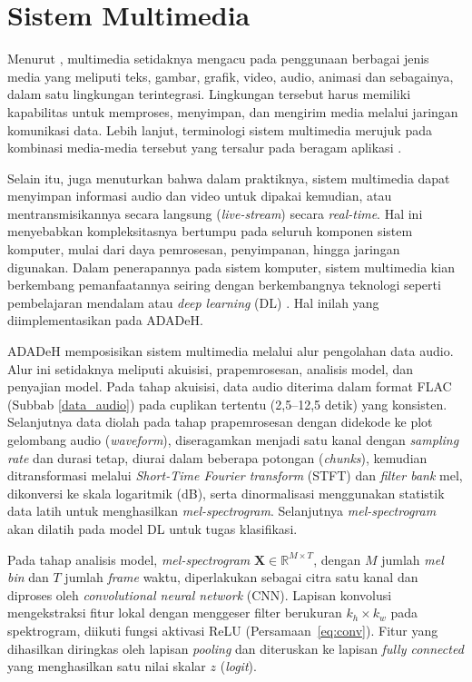 \section{Sistem Multimedia}
\label{sist_mulmed}

Menurut \textcite{bandung2025inovasi}, multimedia setidaknya mengacu pada penggunaan berbagai jenis media yang meliputi teks, gambar, grafik, video, audio, animasi dan sebagainya, dalam satu lingkungan terintegrasi. Lingkungan tersebut harus memiliki kapabilitas untuk memproses, menyimpan, dan mengirim media melalui jaringan komunikasi data. Lebih lanjut, terminologi sistem multimedia merujuk pada kombinasi media-media tersebut yang tersalur pada beragam aplikasi \autocite{furht1994overview}. 

Selain itu, \textcite{furht1994overview} juga menuturkan bahwa dalam praktiknya, sistem multimedia dapat menyimpan informasi audio dan video untuk dipakai kemudian, atau mentransmisikannya secara langsung (\textit{live-stream}) secara \textit{real-time}. Hal ini menyebabkan kompleksitasnya bertumpu pada seluruh komponen sistem komputer, mulai dari daya pemrosesan, penyimpanan, hingga jaringan digunakan. Dalam penerapannya pada sistem komputer, sistem multimedia kian berkembang pemanfaatannya seiring dengan berkembangnya teknologi seperti pembelajaran mendalam atau \textit{deep learning} (DL) \autocite{li2021fundamentals}. Hal inilah yang diimplementasikan pada ADADeH.

ADADeH memposisikan sistem multimedia melalui alur pengolahan data audio. Alur ini setidaknya meliputi akuisisi, prapemrosesan, analisis model, dan penyajian model. Pada tahap akuisisi, data audio diterima dalam format FLAC (Subbab \ref{data_audio}) pada cuplikan tertentu (2,5--12,5 detik) yang konsisten. Selanjutnya data diolah pada tahap prapemrosesan dengan didekode ke plot gelombang audio (\textit{waveform}), diseragamkan menjadi satu kanal dengan \textit{sampling rate} dan durasi tetap, diurai dalam beberapa potongan (\textit{chunks}), kemudian ditransformasi melalui \textit{Short-Time Fourier transform} (STFT) dan \textit{filter bank} mel, dikonversi ke skala logaritmik (dB), serta dinormalisasi menggunakan statistik data latih untuk menghasilkan \textit{mel-spectrogram}. Selanjutnya \textit{mel-spectrogram} akan dilatih pada model DL untuk tugas klasifikasi.

Pada tahap analisis model, \textit{mel-spectrogram} $\mathbf{X} \in \mathbb{R}^{M \times T}$, dengan $M$ jumlah \textit{mel bin} dan $T$ jumlah \textit{frame} waktu, diperlakukan sebagai citra satu kanal dan diproses oleh \textit{convolutional neural network} (CNN). Lapisan konvolusi mengekstraksi fitur lokal dengan menggeser filter berukuran $k_h \times k_w$ pada spektrogram, diikuti fungsi aktivasi ReLU (Persamaan~\ref{eq:conv}). Fitur yang dihasilkan diringkas oleh lapisan \textit{pooling} dan diteruskan ke lapisan \textit{fully connected} yang menghasilkan satu nilai skalar $z$ (\textit{logit}).

